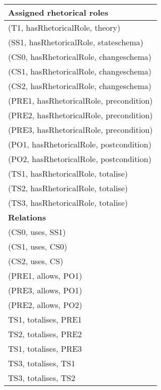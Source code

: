 \documentclass{article}
\begin{document}
{






}


\begin{tabular}{|l|}
\hline
\textbf{Assigned rhetorical roles}\\
\hline
(T1, hasRhetoricalRole, theory) \\
(SS1, hasRhetoricalRole, stateschema) \\
(CS0, hasRhetoricalRole, changeschema) \\
(CS1, hasRhetoricalRole, changeschema) \\
(CS2, hasRhetoricalRole, changeschema) \\
(PRE1, hasRhetoricalRole, precondition) \\
(PRE2, hasRhetoricalRole, precondition) \\
(PRE3, hasRhetoricalRole, precondition) \\
(PO1, hasRhetoricalRole, postcondition) \\
(PO2, hasRhetoricalRole, postcondition) \\
(TS1, hasRhetoricalRole, totalise) \\
(TS2, hasRhetoricalRole, totalise) \\
(TS3, hasRhetoricalRole, totalise) \\
\hline
\hline
\textbf{Relations}\\
\hline
(CS0, uses, SS1)\\
(CS1, uses, CS0)\\
(CS2, uses, CS)\\
(PRE1, allows, PO1)\\
(PRE3, allows, PO1)\\
(PRE2, allows, PO2)\\
TS1, totalises, PRE1 \\
TS2, totalises, PRE2 \\
TS1, totalises, PRE3 \\
TS3, totalises, TS1 \\
TS3, totalises, TS2 \\
\hline
\end{tabular}
\end{document}

